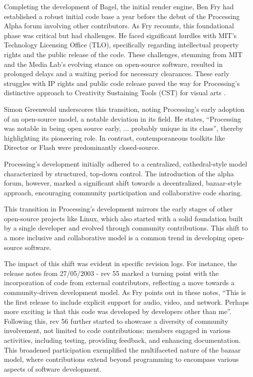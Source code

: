 


Completing the development of Bagel, the initial render engine, Ben Fry had established a robust initial code base a year before the debut of the Processing Alpha forum involving other contributors. As Fry recounts, this foundational phase was critical but had challenges. He faced significant hurdles with MIT’s Technology Licensing Office (TLO), specifically regarding intellectual property rights and the public release of the code. These challenges, stemming from MIT and the Media Lab’s evolving stance on open-source software, resulted in prolonged delays and a waiting period for necessary clearances. These early struggles with IP rights and public code release paved the way for Processing’s distinctive approach to Creativity Sustaining Tools (CST) for visual arts \parencite{shneidermanCreativitySupportTools2002}.

Simon Greenwold underscores this transition, noting Processing’s early adoption of an open-source model, a notable deviation in its field. He states, \enquote{Processing was notable in being open source early, ... probably unique in its class}, thereby highlighting its pioneering role. In contrast, contemporaneous toolkits like Director or Flash were predominantly closed-source.

Processing’s development initially adhered to a centralized, cathedral-style model characterized by structured, top-down control. The introduction of the alpha forum, however, marked a significant shift towards a decentralized, bazaar-style approach, encouraging community participation and collaborative code sharing.

This transition in Processing’s development mirrors the early stages of other open-source projects like Linux, which also started with a solid foundation built by a single developer and evolved through community contributions. This shift to a more inclusive and collaborative model is a common trend in developing open-source software.

The impact of this shift was evident in specific revision logs. For instance, the release notes from 27/05/2003 - rev 55 marked a turning point with the incorporation of code from external contributors, reflecting a move towards a community-driven development model. As Fry points out in these notes, \enquote{This is the first release to include explicit support for audio, video, and network. Perhaps more exciting is that this code was developed by developers other than me}. Following this, rev 56 further started to showcase a diversity of community involvement, not limited to code contributions; members engaged in various activities, including testing, providing feedback, and enhancing documentation. This broadened participation exemplified the multifaceted nature of the bazaar model, where contributions extend beyond programming to encompass various aspects of software development.

